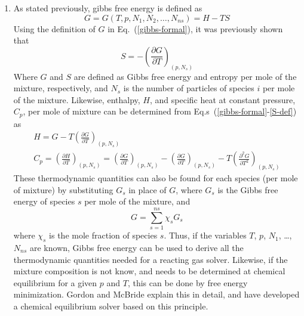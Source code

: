 \documentclass[a4paper]{article}
\newcommand{\eref}[1]{Eq.~(\ref{#1})}
\newcommand{\erefs}[2]{Eq.s~(\ref{#1}-\ref{#2})}
\newcommand{\pd}[2]{\frac{\partial #1}{\partial #2}}
\newcommand{\pnd}[3]{\frac{\partial^{#3} #1}{\partial #2^{#3}}}
\begin{document}
\begin{enumerate}
  \item As stated previously, gibbs free energy is defined as
    \begin{equation}
      G = G(T,p,N_1,N_2,\dots,N_{ns}) = H - TS
      \label{gibbs-formal}
    \end{equation}
    Using the definition of $G$ in \eref{gibbs-formal}, it was previously shown that
    \begin{equation}
      \boxed{ S = -\left( \pd{G}{T} \right)_{(p,N_s)}}
      \label{S-def}
    \end{equation}
    Where $G$ and $S$ are defined as Gibbs free energy and entropy per mole of
    the mixture, respectively, and $N_s$ is the number of particles of species
    $i$ per mole of the mixture.  Likewise, enthalpy, $H$, and specific heat at
    constant pressure, $C_p$, per mole of mixture can be determined from
    \erefs{gibbs-formal}{S-def} as
    \begin{gather}
      \boxed{H = G - T\left( \pd{G}{T} \right)_{(p,N_s)}} \label{h-def} \\
      \boxed{C_p = \left(\pd{H}{T}\right)_{(p,N_s)} 
      = \left( \pd{G}{T} \right)_{(p,N_s)} - \left( \pd{G}{T} \right)_{(p,N_s)}
      - T\left( \pnd{G}{T}{2} \right)_{(p,N_s)}}
      \label{cp-def} \end{gather}
    These thermodynamic quantities can also be found for each species (per mole
    of mixture) by substituting $G_s$ in place of $G$, where $G_s$ is the Gibbs
    free energy of species $s$ per mole of the mixture, and
    \begin{equation}
      G = \sum\limits_{s=1}^{ns}{\chi_s G_s}
      \label{gs-sum}
    \end{equation}
    where $\chi_s$ is the mole fraction of species $s$.  Thus, if the variables
    $T$, $p$, $N_1$, \dots, $N_{ns}$ are known, Gibbs free energy can be used to
    derive all the thermodynamic quantities needed for a reacting gas solver.
    Likewise, if the mixture composition is not know, and needs to be determined
    at chemical equilibrium for a given $p$ and $T$, this can be done by free
    energy minimization.  Gordon and McBride\cite{mcbride} explain this in
    detail, and have developed a chemical equilibrium solver based on this
    principle.
    

\end{enumerate}
\end{document}
